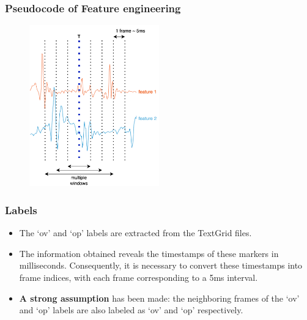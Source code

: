 \documentclass{beamer}
\begin{document}
\begin{frame}[allowframebreaks]
\frametitle{Pseudocode of Feature engineering}
  \begin{figure}
    \centering
    \includegraphics[width=0.5\textwidth]{img/features.png}
  \end{figure}
\end{frame}

\begin{frame}[allowframebreaks]
\frametitle{Labels}
  \begin{itemize}
    \item The `ov' and `op' labels are extracted from the TextGrid files.
    \item The information obtained reveals the timestamps of these markers in milliseconds. Consequently, it is necessary to convert these timestamps into frame indices, with each frame corresponding to a 5ms interval.
    \item \textbf{A strong assumption} has been made: the neighboring frames of the `ov' and `op' labels are also labeled as `ov' and `op' respectively.
  \end{itemize}
\end{frame}
\end{document}
